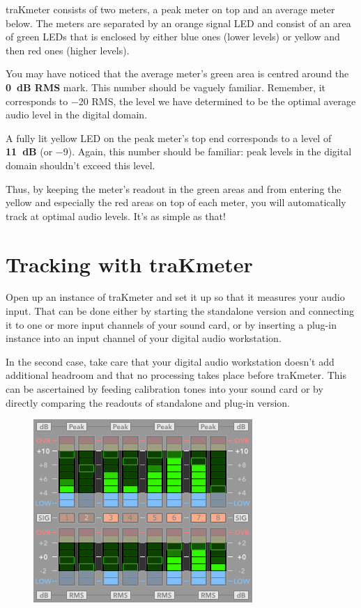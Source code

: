 traKmeter consists of two meters, a peak meter on top and an average
meter below.  The meters are separated by an orange signal LED and
consist of an area of green LEDs that is enclosed by either blue ones
(lower levels) or yellow and then red ones (higher levels).

You may have noticed that the average meter's green area is centred
around the \textbf{\SI{0}{\dB} RMS} mark.  This number should be
vaguely familiar.  Remember, it corresponds to \SI{-20}{\dBFS} RMS,
the level we have determined to be the optimal average audio level in
the digital domain.

A fully lit yellow LED on the peak meter's top end corresponds to a
level of \textbf{\SI[addsign=all]{+11}{\dB}} (or \SI{-9}{\dBFS}).
Again, this number should be familiar: peak levels in the digital
domain shouldn't exceed this level.

Thus, by keeping the meter's readout in the green areas and from
entering the yellow and especially the red areas on top of each meter,
you will automatically track at optimal audio levels.  It's as simple
as that!

\section{Tracking with traKmeter}
\label{sec:tracking_with_trakmeter}

Open up an instance of traKmeter and set it up so that it measures
your audio input.  That can be done either by starting the standalone
version and connecting it to one or more input channels of your sound
card, or by inserting a plug-in instance into an input channel of your
digital audio workstation.

In the second case, take care that your digital audio workstation
doesn't add additional headroom and that no processing takes place
before traKmeter.  This can be ascertained by feeding calibration
tones into your sound card or by directly comparing the readouts of
standalone and plug-in version.

\begin{figure}
\includegraphics[scale=0.45,clip]{include/images/trakmeter_optimal.png}
\end{figure}

